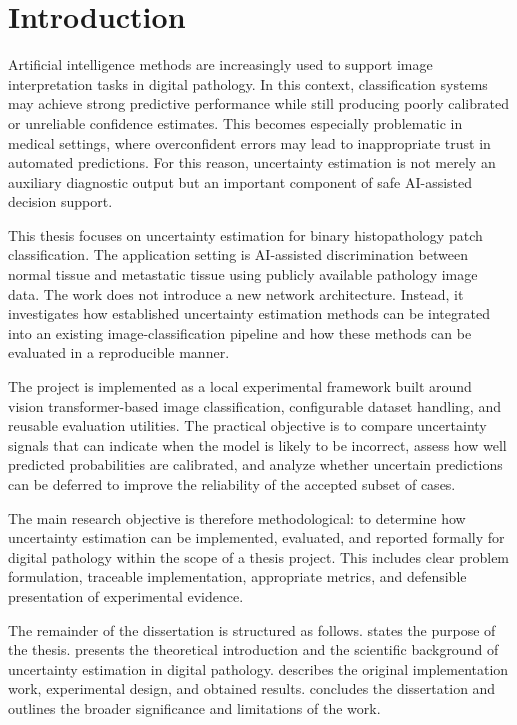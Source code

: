 \chapter{Introduction}
\label{chap:introduction}

Artificial intelligence methods are increasingly used to support image interpretation tasks in digital pathology. In this context, classification systems may achieve strong predictive performance while still producing poorly calibrated or unreliable confidence estimates. This becomes especially problematic in medical settings, where overconfident errors may lead to inappropriate trust in automated predictions. For this reason, uncertainty estimation is not merely an auxiliary diagnostic output but an important component of safe AI-assisted decision support.

This thesis focuses on uncertainty estimation for binary histopathology patch classification. The application setting is AI-assisted discrimination between normal tissue and metastatic tissue using publicly available pathology image data. The work does not introduce a new network architecture. Instead, it investigates how established uncertainty estimation methods can be integrated into an existing image-classification pipeline and how these methods can be evaluated in a reproducible manner.

The project is implemented as a local experimental framework built around vision transformer-based image classification, configurable dataset handling, and reusable evaluation utilities. The practical objective is to compare uncertainty signals that can indicate when the model is likely to be incorrect, assess how well predicted probabilities are calibrated, and analyze whether uncertain predictions can be deferred to improve the reliability of the accepted subset of cases.

The main research objective is therefore methodological: to determine how uncertainty estimation can be implemented, evaluated, and reported formally for digital pathology within the scope of a thesis project. This includes clear problem formulation, traceable implementation, appropriate metrics, and defensible presentation of experimental evidence.

The remainder of the dissertation is structured as follows.  states the purpose of the thesis.  presents the theoretical introduction and the scientific background of uncertainty estimation in digital pathology.  describes the original implementation work, experimental design, and obtained results.  concludes the dissertation and outlines the broader significance and limitations of the work.

